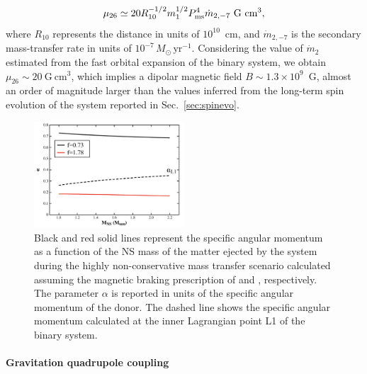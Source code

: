 \documentclass[fleqn,usenatbib]{mnras}
\begin{document}
\begin{equation}           
\mu_{26}\simeq20 R^{-1/2}_{10} m_1^{1/2}P^4_{\rm ms}\dot{m}_{2,-7} ~\text{G}~\text{cm}^3,
\end{equation}
where $R_{10}$ represents the distance in units of $10^{10}$~cm, and $\dot{m}_{2,-7}$ is the secondary mass-transfer rate in units of $10^{-7}\,{M}_\odot\,\text{yr}^{-1}$. Considering the value of $\dot{m}_2$ estimated from the fast orbital expansion of the binary system, we obtain $\mu_{26}\sim 20~\text{G}~\text{cm}^3$, which implies a dipolar magnetic field $B\sim 1.3\times 10^9$~G, almost an order of magnitude larger than the values inferred from the long-term spin evolution of the system reported in Sec.~\ref{sec:spinevo}.
\begin{figure}
\centering
\includegraphics[width=0.5\textwidth]{alpha_vs_m1_non_conservative}
\caption{Black and red solid lines represent the specific angular momentum as a function of the NS mass of the matter ejected by the system during the highly non-conservative mass transfer scenario calculated assuming the magnetic braking prescription of \citet[][f=0.73]{Skumanich:1972vy} and \citet[][f=1.78]{Smith:1979vn}, respectively. The parameter $\alpha$ is reported in units of the specific angular momentum of the donor. The dashed line shows the specific angular momentum calculated at the inner Lagrangian point L1 of the binary system.}
\label{fig:alpha}
\end{figure} 


\paragraph{Gravitation quadrupole coupling} 
\end{document}
